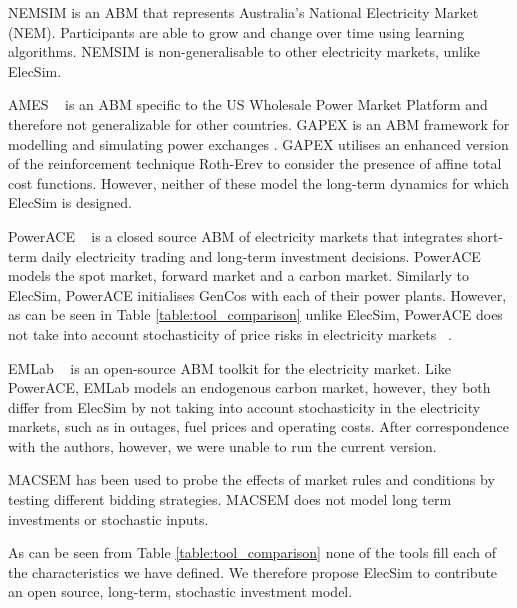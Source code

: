 NEMSIM \cite{Grozev2005} is an ABM that represents Australia's National Electricity Market (NEM). Participants are able to grow and change over time using learning algorithms. NEMSIM is non-generalisable to other electricity markets, unlike ElecSim.

AMES ~\cite{Sun2007} is an ABM specific to the US Wholesale Power Market Platform and therefore not generalizable for other countries. GAPEX \cite{Cincotti2013} is an ABM framework for modelling and simulating power exchanges . GAPEX utilises an enhanced version of the reinforcement technique Roth-Erev \cite{RothAE1995} to consider the presence of affine total cost functions. However, neither of these model the long-term dynamics for which ElecSim is designed.



PowerACE ~\cite{Rothengatter2007} is a closed source ABM of electricity markets that integrates short-term daily electricity trading and long-term investment decisions. PowerACE models the spot market, forward market and a carbon market. Similarly to ElecSim, PowerACE initialises GenCos with each of their power plants. However, as can be seen in Table \ref{table:tool_comparison} unlike ElecSim, PowerACE does not take into account stochasticity of price risks in electricity markets ~\cite{Most2010}.

EMLab ~\cite{Chappin2017} is an open-source ABM toolkit for the electricity market. Like PowerACE, EMLab models an endogenous carbon market, however, they both differ from ElecSim by not taking into account stochasticity in the electricity markets, such as in outages, fuel prices and operating costs. After correspondence with the authors, however, we were unable to run the current version.

MACSEM \cite{Praca2003} has been used to probe the effects of market rules and conditions by testing different bidding strategies. MACSEM does not model long term investments or stochastic inputs.


As can be seen from Table \ref{table:tool_comparison} none of the tools fill each of the characteristics we have defined. We therefore propose ElecSim to contribute an open source, long-term, stochastic investment model. 


